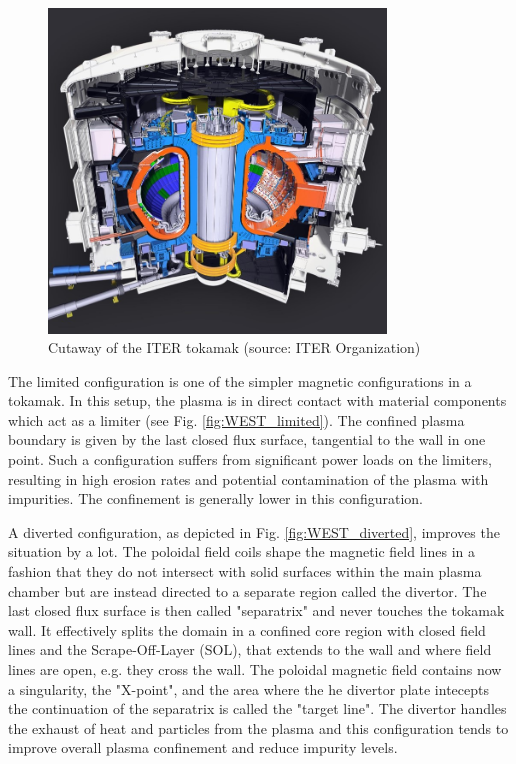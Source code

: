 \begin{figure}[H]
	\centering
	\includegraphics[width=0.8\textwidth]{schemes/ITER_2.jpg}
	\caption{Cutaway of the ITER tokamak (source: ITER Organization)}
	\label{fig:1_ITER}
\end{figure}

The limited configuration is one of the simpler magnetic configurations in a tokamak. In this setup, the plasma is in direct contact with material components which act as a limiter (see Fig. \ref{fig:WEST_limited}). The confined plasma boundary is given by the last closed flux surface, tangential to the wall in one point. Such a configuration suffers from significant power loads on the limiters, resulting in high erosion rates and potential contamination of the plasma with impurities. The confinement is generally lower in this configuration.

A diverted configuration, as depicted in Fig. \ref{fig:WEST_diverted}, improves the situation by a lot. The poloidal field coils shape the magnetic field lines in a fashion that they do not intersect with solid surfaces within the main plasma chamber but are instead directed to a separate region called the divertor. The last closed flux surface is then called "separatrix" and never touches the tokamak wall. It effectively splits the domain in a confined core region with closed field lines and the Scrape-Off-Layer (SOL), that extends to the wall and where field lines are open, e.g. they cross the wall. The poloidal magnetic field contains now a singularity, the "X-point", and the area where the he divertor plate intecepts the continuation of the separatrix is called the "target line". The divertor handles the exhaust of heat and particles from the plasma and this configuration tends to improve overall plasma confinement and reduce impurity levels.

